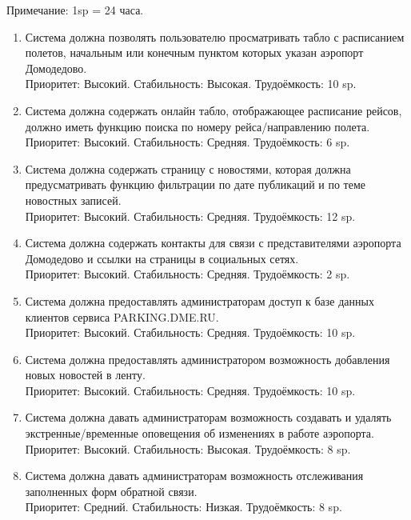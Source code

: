 Примечание: 1sp = 24 часа.
\begin{enumerate}
      \item Система должна позволять пользователю просматривать
            табло с расписанием полетов, начальным или конечным
            пунктом которых указан аэропорт Домодедово. \\
            Приоритет: Высокий. Стабильность: Высокая. Трудоёмкость: 10 sp.

      \item Система должна содержать онлайн табло, отображающее расписание рейсов,
            должно иметь функцию поиска по номеру рейса/направлению полета. \\
            Приоритет: Высокий. Стабильность: Средняя. Трудоёмкость: 6 sp.

      \item Система должна содержать страницу с новостями, которая должна
            предусматривать функцию фильтрации по дате публикаций и по
            теме новостных записей. \\
            Приоритет: Высокий. Стабильность: Средняя. Трудоёмкость: 12 sp.

      \item Система должна содержать контакты для связи с
            представителями аэропорта Домодедово и ссылки
            на страницы в социальных сетях. \\
            Приоритет: Высокий. Стабильность: Средняя. Трудоёмкость: 2 sp.

      \item Система должна предоставлять администраторам
            доступ к базе данных клиентов сервиса
            PARKING.DME.RU. \\
            Приоритет: Высокий. Стабильность: Средняя. Трудоёмкость: 10 sp.

      \item Система должна предоставлять администратором возможность
            добавления новых новостей в ленту. \\
            Приоритет: Высокий. Стабильность: Средняя. Трудоёмкость: 10 sp.

      \item Система должна давать администраторам возможность
            создавать и удалять экстренные/временные
            оповещения об изменениях в работе аэропорта. \\
            Приоритет: Высокий. Стабильность: Высокая. Трудоёмкость: 8 sp.

      \item Система должна давать администраторам возможность
            отслеживания заполненных форм обратной связи. \\
            Приоритет: Средний. Стабильность: Низкая. Трудоёмкость: 8 sp.


\end{enumerate}
